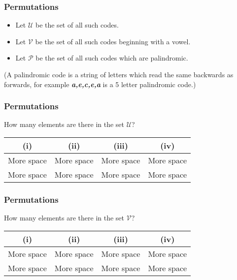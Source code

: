 \documentclass[IntroMain.tex]{subfiles}
\begin{document}
\begin{frame}

\frametitle{Permutations}
\Large
\begin{itemize}
\item Let $\mathcal{U}$ be the set of all such codes.
\item Let $\mathcal{V}$ be the set of all such codes beginning with a vowel.
\item Let $\mathcal{P}$ be the set of all such codes which are palindromic.
\end{itemize} 
\bigskip
(A palindromic code is a string of letters which read the same backwards as forwards, for example \textbf{\textit{a,e,c,e,a}} is a 5 letter palindromic code.)\\ \bigskip

\end{frame}

\begin{frame}

\frametitle{Permutations}
\Large
How many elements are there in the set $\mathcal{U}$?
\begin{center}
\begin{tabular}{|c|c|c|c|}
\hline (i) &  (ii) &  (iii) &  (iv) \\ 
\hline {\color{white}More space} &{\color{white}More space}  & {\color{white}More space} &{\color{white}More space}  \\ 
 {\color{white}More space} &{\color{white}More space}  & {\color{white}More space} &{\color{white}More space}  \\ 
\hline 
\end{tabular} 
\end{center}
\end{frame}

\begin{frame}

\frametitle{Permutations}
\Large
How many elements are there in the set $\mathcal{V}$?
\begin{center}
\begin{tabular}{|c|c|c|c|}
\hline (i) &  (ii) &  (iii) &  (iv) \\ 
\hline {\color{white}More space} &{\color{white}More space}  & {\color{white}More space} &{\color{white}More space}  \\ 
 {\color{white}More space} &{\color{white}More space}  & {\color{white}More space} &{\color{white}More space}  \\ 
\hline 
\end{tabular} 
\end{center}
\end{frame}
\end{document}
